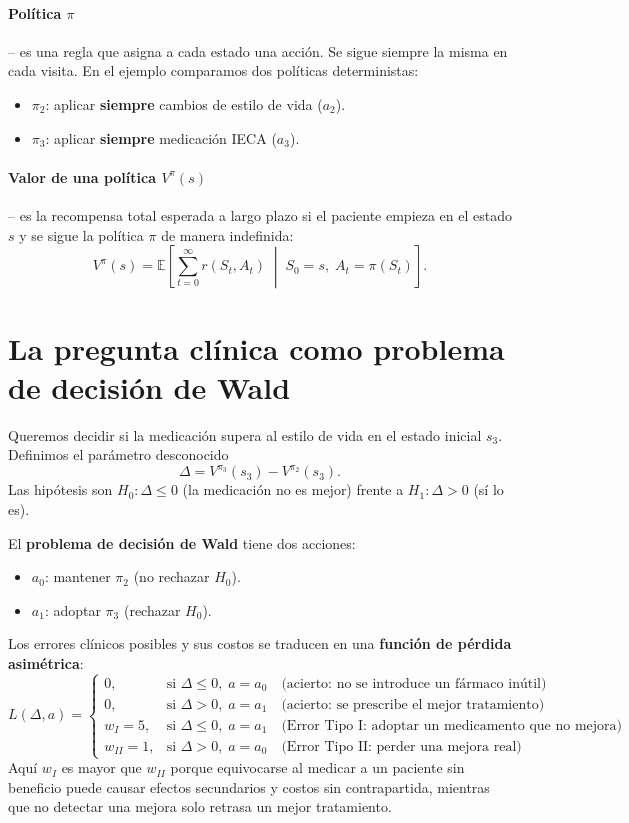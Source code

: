 \documentclass[12pt,a4paper]{article}
\begin{document}
	\paragraph{Política \(\pi\)} – es una regla que asigna a cada estado una acción. Se sigue siempre la misma en cada visita. En el ejemplo comparamos dos políticas deterministas:
	\begin{itemize}
		\item \(\pi_2\): aplicar \textbf{siempre} cambios de estilo de vida (\(a_2\)).
		\item \(\pi_3\): aplicar \textbf{siempre} medicación IECA (\(a_3\)).
	\end{itemize}
	
	\paragraph{Valor de una política \(V^\pi(s)\)} – es la recompensa total esperada a largo plazo si el paciente empieza en el estado \(s\) y se sigue la política \(\pi\) de manera indefinida:
	\[
	V^\pi(s) = \mathbb{E}\!\left[ \sum_{t=0}^{\infty} r(S_t, A_t) \;\middle|\; S_0 = s,\; A_t = \pi(S_t) \right].
	\]
	
	\section{La pregunta clínica como problema de decisión de Wald}
	
	Queremos decidir si la medicación supera al estilo de vida en el estado inicial \(s_3\). Definimos el parámetro desconocido
	\[
	\Delta = V^{\pi_3}(s_3) - V^{\pi_2}(s_3).
	\]
	Las hipótesis son \(H_0: \Delta \le 0\) (la medicación no es mejor) frente a \(H_1: \Delta > 0\) (sí lo es).
	
	El \textbf{problema de decisión de Wald} tiene dos acciones:
	\begin{itemize}
		\item \(a_0\): mantener \(\pi_2\) (no rechazar \(H_0\)).
		\item \(a_1\): adoptar \(\pi_3\) (rechazar \(H_0\)).
	\end{itemize}
	
	Los errores clínicos posibles y sus costos se traducen en una \textbf{función de pérdida asimétrica}:
	\[
	L(\Delta, a) =
	\begin{cases}
		0, & \text{si } \Delta \le 0,\; a = a_0 \quad\text{(acierto: no se introduce un fármaco inútil)} \\
		0, & \text{si } \Delta > 0,\; a = a_1 \quad\text{(acierto: se prescribe el mejor tratamiento)} \\
		w_I = 5, & \text{si } \Delta \le 0,\; a = a_1 \quad\text{(Error Tipo I: adoptar un medicamento que no mejora)} \\
		w_{II} = 1, & \text{si } \Delta > 0,\; a = a_0 \quad\text{(Error Tipo II: perder una mejora real)}
	\end{cases}
	\]
	Aquí \(w_I\) es mayor que \(w_{II}\) porque equivocarse al medicar a un paciente sin beneficio puede causar efectos secundarios y costos sin contrapartida, mientras que no detectar una mejora solo retrasa un mejor tratamiento.
	
\end{document}
